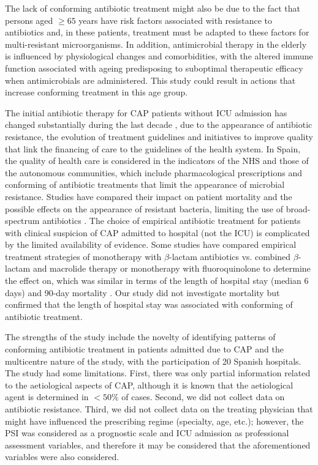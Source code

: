 \documentclass[11pt, a4paper]{article}
\begin{document}
\begin{multicols}{2}
The lack of conforming antibiotic treatment might also be due to the fact that persons aged $\geq65$ years have risk factors associated with resistance to antibiotics and, in these patients, treatment must be adapted to these factors for multi-resistant microorganisms. In addition, antimicrobial therapy in the elderly is influenced by physiological changes and comorbidities, with the altered immune function associated with ageing predisposing to suboptimal therapeutic efficacy when antimicrobials are administered. This study could result in actions that increase conforming treatment in this age group.

The initial antibiotic therapy for CAP patients without ICU admission has changed substantially during the last decade \cite{berger2014patterns}, due to the appearance of antibiotic resistance, the evolution of treatment guidelines and initiatives to improve quality that link the financing of care to the guidelines of the health system. In Spain, the quality of health care is considered in the indicators of the NHS and those of the autonomous communities, which include pharmacological prescriptions and conforming of antibiotic treatments that limit the appearance of microbial resistance. Studies have compared their impact on patient mortality and the possible effects on the appearance of resistant bacteria, limiting the use of broad-spectrum antibiotics \cite{postma2015antibiotic, pradelli2015community, wang2016comparative}. The choice of empirical antibiotic treatment for patients with clinical suspicion of CAP admitted to hospital (not the ICU) is complicated by the limited availability of evidence. Some studies have compared empirical treatment strategies of monotherapy with $\beta$-lactam antibiotics vs. combined $\beta$-lactam and macrolide therapy or monotherapy with fluoroquinolone to determine the effect on, which was similar in terms of the length of hospital stay (median 6 days) and 90-day mortality \cite{postma2015antibiotic}. Our study did not investigate mortality but confirmed that the length of hospital stay was associated with conforming of antibiotic treatment.

The strengths of the study include the novelty of identifying patterns of conforming antibiotic treatment in patients admitted due to CAP and the multicentre nature of the study, with the participation of 20 Spanish hospitals. The study had some limitations. First, there was only partial information related to the aetiological aspects of CAP, although it is known that the aetiological agent is determined in $<50\%$ of cases. Second, we did not collect data on antibiotic resistance. Third, we did not collect data on the treating physician that might have influenced the prescribing regime (specialty, age, etc.); however, the PSI was considered as a prognostic scale \cite{menendez2010neumonia} and ICU admission as professional assessment variables, and therefore it may be considered that the aforementioned variables were also considered.


\end{multicols}
\end{document}
